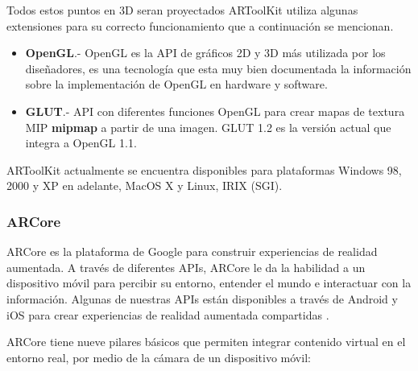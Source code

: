 Todos estos puntos en 3D seran proyectados 
\newpage
ARToolKit utiliza algunas extensiones para su correcto funcionamiento que a continuación se mencionan.
\begin{itemize}
	\item \textbf{OpenGL}.- OpenGL es la API de gráficos 2D y 3D más  utilizada por los diseñadores, es una tecnología que esta muy bien documentada la información sobre la implementación de OpenGL en hardware y software.\cite{B14}
	
	\item \textbf{GLUT}.- API con diferentes funciones OpenGL para crear mapas de textura MIP \textbf{mipmap} a partir de una imagen. GLUT 1.2 es la versión actual que integra a OpenGL 1.1.\cite{B19}
	
\end{itemize}
\noindent
ARToolKit actualmente se encuentra disponibles para plataformas Windows 98, 2000 y XP en adelante, MacOS X y Linux, IRIX (SGI).\cite{B19}
\newpage
\noindent

\subsubsection{ARCore}
ARCore es la plataforma de Google para construir experiencias de realidad aumentada. A través de diferentes APIs, ARCore le da la habilidad a un dispositivo móvil para percibir su entorno, entender el mundo e interactuar con la información. Algunas de nuestras APIs están disponibles a través de Android y iOS para crear experiencias de realidad aumentada compartidas \cite{B14}.\par
ARCore tiene nueve pilares básicos que permiten integrar contenido virtual en el entorno real, por medio de la cámara de un dispositivo móvil:


